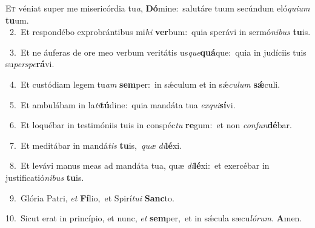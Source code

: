 \lettrine{\initial\textcolor{\initialcolor}{E}}{t} véniat super me misericórdia tu\-\textit{a}\-, \textbf{Dó}\-mine:~\star salutáre tuum secúndum eló\-\textit{qui}\-\textit{um} \textbf{tu}\-um.\\
{\numbfont\textcolor{\numbcolor}{~2.}}~Et respondébo exprobrántibus mi\textit{hi} \textbf{ver}\-bum:~\star quia sperávi in sermó\-\textit{ni}\-\textit{bus} \textbf{tu}\-is.\par
{\numbfont\textcolor{\numbcolor}{~3.}}~Et ne áuferas de ore meo verbum veritátis us\-\textit{que}\-\textbf{quá}que:~\star quia in judíciis tuis su\-\textit{per}\-\textit{spe}\textbf{rá}vi.\par
{\numbfont\textcolor{\numbcolor}{~4.}}~Et custódiam legem tu\textit{am} \textbf{sem}\-per:~\star in sǽculum et in sǽ\-\textit{cu}\-\textit{lum} \textbf{sǽ}\-culi.\par
{\numbfont\textcolor{\numbcolor}{~5.}}~Et ambulábam in la\-\textit{ti}\-\textbf{tú}dine:~\star quia mandáta tua \textit{ex}\-\textit{qui}\textbf{sí}vi.\par
{\numbfont\textcolor{\numbcolor}{~6.}}~Et loquébar in testimóniis tuis in conspéc\textit{tu} \textbf{re}\-gum:~\star et non \textit{con}\-\textit{fun}\textbf{dé}bar.\par
{\numbfont\textcolor{\numbcolor}{~7.}}~Et meditábar in mandá\textit{tis} \textbf{tu}\-is,~\star \textit{quæ} \textit{di}\-\textbf{lé}xi.\par
{\numbfont\textcolor{\numbcolor}{~8.}}~Et levávi manus meas ad mandáta tua, quæ \textit{di}\-\textbf{lé}xi:~\star et exercébar in justificatió\-\textit{ni}\-\textit{bus} \textbf{tu}\-is.\par
{\numbfont\textcolor{\numbcolor}{~9.}}~Glória Patri, \textit{et} \textbf{Fí}\-lio,~\star et Spirí\-\textit{tu}\-\textit{i} \textbf{Sanc}\-to.\par
{\numbfont\textcolor{\numbcolor}{10.}}~Sicut erat in princípio, et nunc, \textit{et} \textbf{sem}\-per,~\star et in sǽcula sæcu\-\textit{ló}\-\textit{rum}. \textbf{A}\-men.\par
